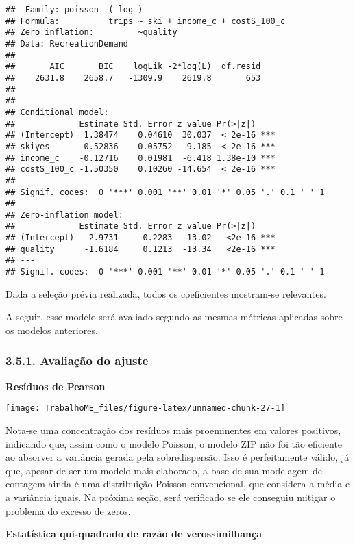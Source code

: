 \documentclass[
]{article}
\begin{document}
\begin{verbatim}
##  Family: poisson  ( log )
## Formula:          trips ~ ski + income_c + costS_100_c
## Zero inflation:         ~quality
## Data: RecreationDemand
## 
##       AIC       BIC    logLik -2*log(L)  df.resid 
##    2631.8    2658.7   -1309.9    2619.8       653 
## 
## 
## Conditional model:
##             Estimate Std. Error z value Pr(>|z|)    
## (Intercept)  1.38474    0.04610  30.037  < 2e-16 ***
## skiyes       0.52836    0.05752   9.185  < 2e-16 ***
## income_c    -0.12716    0.01981  -6.418 1.38e-10 ***
## costS_100_c -1.50350    0.10260 -14.654  < 2e-16 ***
## ---
## Signif. codes:  0 '***' 0.001 '**' 0.01 '*' 0.05 '.' 0.1 ' ' 1
## 
## Zero-inflation model:
##             Estimate Std. Error z value Pr(>|z|)    
## (Intercept)   2.9731     0.2283   13.02   <2e-16 ***
## quality      -1.6184     0.1213  -13.34   <2e-16 ***
## ---
## Signif. codes:  0 '***' 0.001 '**' 0.01 '*' 0.05 '.' 0.1 ' ' 1
\end{verbatim}

Dada a seleção prévia realizada, todos os coeficientes mostram-se
relevantes.

A seguir, esse modelo será avaliado segundo as mesmas métricas aplicadas
sobre os modelos anteriores.

\subsubsection{3.5.1. Avaliação do
ajuste}\label{avaliauxe7uxe3o-do-ajuste}

\textbf{Resíduos de Pearson}

\begin{center}\texttt{[image: TrabalhoME\_files/figure-latex/unnamed-chunk-27-1]} \end{center}

Nota-se uma concentração dos resíduos mais proeminentes em valores
positivos, indicando que, assim como o modelo Poisson, o modelo ZIP não
foi tão eficiente ao absorver a variância gerada pela sobredispersão.
Isso é perfeitamente válido, já que, apesar de ser um modelo mais
elaborado, a base de sua modelagem de contagem ainda é uma distribuição
Poisson convencional, que considera a média e a variância iguais. Na
próxima seção, será verificado se ele conseguiu mitigar o problema do
excesso de zeros.

\textbf{Estatística qui-quadrado de razão de verossimilhança}
\end{document}

